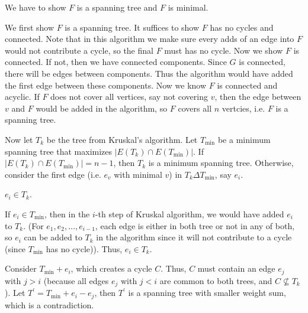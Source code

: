 \begin{explanation}
    We have to show \(F\) is a spanning tree and \(F\) is minimal. 

    We first show \(F\) is a spanning tree. It suffices to show \(F\) has no cycles and connected. Note that in this algorithm we make sure every adds of an edge into \(F\) would not contribute a cycle, so the final \(F\) must has no cycle. Now we show \(F\) is connected. If not, then we have connected components. Since \(G\) is connected, there will be edges between components. Thus the algorithm would have added the first edge between these components. Now we know \(F\) is connected and acyclic. If \(F\) does not cover all vertices, say not covering \(v\), then the edge between \(v\) and \(F\) would be added in the algorithm, so \(F\) covers all \(n\) vertcies, i.e. \(F\) is a spanning tree.          

    Now let \(T_k\) be the tree from Kruskal's algorithm. Let \(T_{\text{min} }\) be a minimum spanning tree that maximizes \(\left\vert E(T_k) \cap E(T_{\text{min} }) \right\vert \). If \(\left\vert E(T_k) \cap E(T_{\text{min} }) \right\vert = n - 1 \), then \(T_k\) is a minimum spanning tree. Otherwise, consider the first edge (i.e. \(e_v\) with minimal \(v\)) in \(T_k \Delta T_{\text{min} }\), say \(e_i\).
    \begin{claim}
        \(e_i \in T_k\).
    \end{claim}        
    \begin{explanation}
        If \(e_i \in T_{\text{min}}\), then in the \(i\)-th step of Kruskal algorithm, we would have added \(e_i\) to \(T_k\). (For \(e_1, e_2, \dots , e_{i-1}\), each edge is either in both tree or not in any of both, so \(e_i\) can be added to \(T_k\) in the algorithm since it will not contribute to a cycle (since \(T_{\text{min} }\) has no cycle)). Thus, \(e_i \in T_k\).  
    \end{explanation}      
    Consider \(T_{\text{min} } + e_i\), which creates a cycle \(C\). Thus, \(C\) must contain an edge \(e_j\) with \(j > i\) (because all edges \(e_j\) with \(j < i\) are common to both trees, and \(C \nsubseteq T_k\)). Let \(T^{\prime} = T_{\min } + e_i - e_j\), then \(T^{\prime} \) is a spanning tree with smaller weight sum, which is a contradiction.      
\end{explanation}